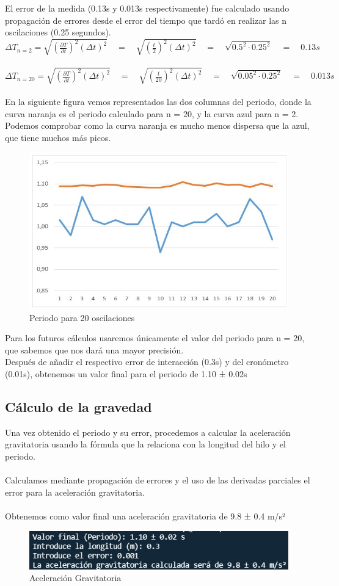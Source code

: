 \documentclass{article}
\begin{document}
El error de la medida (0.13s y 0.013s respectivamente) fue calculado usando propagación de errores desde el error del tiempo que tardó en realizar las n oscilaciones (0.25 segundos). \\
$\Delta T_{n=2} = \sqrt{\left( \frac{\partial{T}}{\partial{t}}\right)^2\left(\Delta t\right)^2} \quad = \quad \sqrt{\left(\frac{t}{2}\right)^2\left(\Delta t\right)^2}  \quad = \quad \sqrt{0.5^2 \cdot 0.25^2} \quad = \quad 0.13s$ \\\\
$\Delta T_{n=20} = \sqrt{\left( \frac{\partial{T}}{\partial{t}}\right)^2\left(\Delta t\right)^2} \quad = \quad \sqrt{\left(\frac{t}{20}\right)^2\left(\Delta t\right)^2}  \quad = \quad \sqrt{0.05^2 \cdot 0.25^2} \quad = \quad 0.013s$ 
\\\\
En la siguiente figura vemos representados las dos columnas del periodo, donde la curva naranja es el periodo calculado para n = 20, y la curva azul para n = 2. Podemos comprobar como la curva naranja es mucho menos dispersa que la azul, que tiene muchos más picos.

\begin{figure}
    \centering
    \includegraphics[width=.45\textwidth]{fotos/periodo.jpg}
    \caption{Periodo para 20 oscilaciones}
\end{figure}
Para los futuros cálculos usaremos únicamente el valor del periodo para n = 20, que sabemos que nos dará una mayor precisión. \\
Después de añadir el respectivo error de interacción (0.3s) y del cronómetro (0.01s), obtenemos un valor final para el periodo de 1.10 ± 0.02s
\subsection{Cálculo de la gravedad}
Una vez obtenido el periodo y su error, procedemos a calcular la aceleración gravitatoria usando la fórmula que la relaciona con la longitud del hilo y el periodo. \\\\ Calculamos mediante propagación de errores y el uso de las derivadas parciales el error para la aceleración gravitatoria. \\\\ Obtenemos como valor final una aceleración gravitatoria de 9.8 ± 0.4 m/s²
\begin{figure}[h]
    \centering
    \includegraphics[width=.6\textwidth]{fotos/gravedad.jpg}
    \caption{Aceleración Gravitatoria}
\end{figure}
\end{document}

